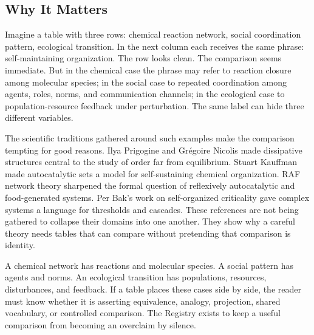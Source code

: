 \documentclass[11pt,a4paper,openany]{book}
\begin{document}
\subsection{Why It Matters}
Imagine a table with three rows: chemical reaction network, social coordination pattern, ecological transition. In the next column each receives the same phrase: self-maintaining organization. The row looks clean. The comparison seems immediate. But in the chemical case the phrase may refer to reaction closure among molecular species; in the social case to repeated coordination among agents, roles, norms, and communication channels; in the ecological case to population-resource feedback under perturbation. The same label can hide three different variables. \cite{nicolis_prigogine_selforg,kauffman_autocatalytic}\par
The scientific traditions gathered around such examples make the comparison tempting for good reasons. Ilya Prigogine and Grégoire Nicolis made dissipative structures central to the study of order far from equilibrium. Stuart Kauffman made autocatalytic sets a model for self-sustaining chemical organization. RAF network theory sharpened the formal question of reflexively autocatalytic and food-generated systems. Per Bak's work on self-organized criticality gave complex systems a language for thresholds and cascades. These references are not being gathered to collapse their domains into one another. They show why a careful theory needs tables that can compare without pretending that comparison is identity.\par
A chemical network has reactions and molecular species. A social pattern has agents and norms. An ecological transition has populations, resources, disturbances, and feedback. If a table places these cases side by side, the reader must know whether it is asserting equivalence, analogy, projection, shared vocabulary, or controlled comparison. The Registry exists to keep a useful comparison from becoming an overclaim by silence.\par
\end{document}
